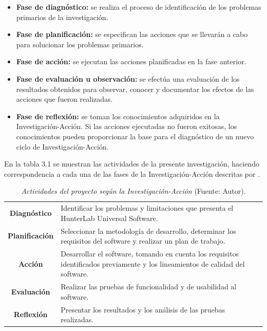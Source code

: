 	\begin{itemize}
		\item \textbf{Fase de diagn\'{o}stico:} se realiza el proceso de identificaci\'{o}n de los problemas primarios de la investigaci\'{o}n.
		\item \textbf{Fase de planificaci\'{o}n:} se especifican las acciones que se llevar\'{a}n a cabo para solucionar los problemas primarios.
		\item \textbf{Fase de acci\'{o}n:} se ejecutan las acciones planificadas en la fase anterior.
		\item \textbf{Fase de evaluaci\'{o}n u observaci\'{o}n:} se efect\'{u}a una evaluaci\'{o}n de los resultados obtenidos para observar, conocer y documentar los efectos de las acciones que fueron realizadas.
		\item \textbf{Fase de reflexi\'{o}n:} se toman los conocimientos adquiridos en la Investigaci\'{o}n-Acci\'{o}n. Si las acciones ejecutadas no fueron exitosas, los conocimientos pueden proporcionar la base para el diagn\'{o}stico de un nuevo ciclo de Investigaci\'{o}n-Acci\'{o}n.
	\end{itemize}

En la tabla 3.1 se muestran las actividades de la presente investigaci\'{o}n, haciendo correspondencia a cada una de las fases de la Investigaci\'{o}n-Acci\'{o}n descritas por \cite{Baskerville}.

	\begin{table}[t]
		\small
		\caption[Actividades del proyecto seg\'{u}n la Investigaci\'{o}n-Acci\'{o}n]{\textit{Actividades del proyecto seg\'{u}n la Investigaci\'{o}n-Acci\'{o}n} (Fuente: Autor).}
		\centering
		\setlength{\extrarowheight}{\altocelda}
		\begin{tabulary}{\anchotabla}{|c|J|}
			\hline
			 & \\ \hline
			\textbf{Diagn\'{o}stico} & Identificar los problemas y limitaciones que presenta el HunterLab Universal Software.\\ \hline
			\textbf{Planificaci\'{o}n} & Seleccionar la metodolog\'{i}a de desarrollo, determinar los requisitos del software y realizar un plan de trabajo.
\\ \hline
			\textbf{Acci\'{o}n} & Desarrollar el software, tomando en cuenta los requisitos identificados previamente y los lineamientos de calidad del software.\\ \hline
			\textbf{Evaluaci\'{o}n} & Realizar las pruebas de funcionalidad y de usabilidad al software.\\ \hline
			\textbf{Reflexi\'{o}n} & Presentar los resultados y los an\'{a}lisis de las pruebas realizadas.\\ \hline
		\end{tabulary}
	\end{table}

